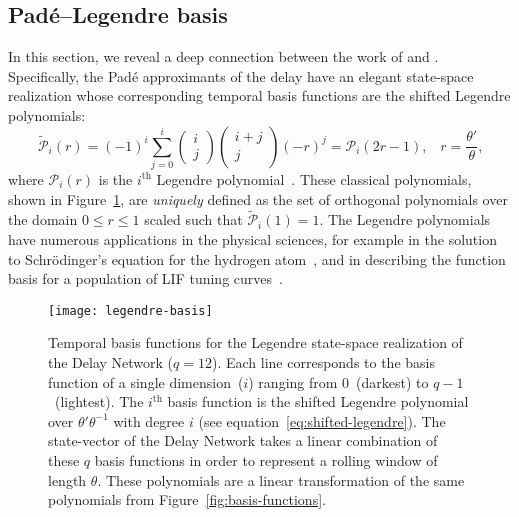 \subsection{Pad\'e--Legendre basis}
\label{sec:legendre-basis}

In this section, we reveal a deep connection between the work of \citet{legendre1782recherches} and \citet{Pade1892}.
Specifically, the Pad\'e approximants of the delay have an elegant state-space realization whose corresponding temporal basis functions are the shifted Legendre polynomials:
\begin{equation} \label{eq:shifted-legendre}
\tilde{\mathcal{P}}_i(r) = (-1)^i \sum_{j=0}^i \begin{pmatrix}i \\ j\end{pmatrix} \begin{pmatrix}i + j \\ j\end{pmatrix} \left( -r \right)^j = \mathcal{P}_i\left( 2 r - 1\right) \text{,} \quad r = \frac{\theta'}{\theta} \text{,}
\end{equation}
where $\mathcal{P}_i(r)$ is the $i^\text{th}$ Legendre polynomial~\citep{rodrigues1816attraction}.
These classical polynomials, shown in Figure~\ref{fig:legendre-basis}, are \emph{uniquely} defined as the set of orthogonal polynomials over the domain $0 \le r \le 1$ scaled such that $\tilde{\mathcal{P}}_i(1) = 1$.
The Legendre polynomials have numerous applications in the physical sciences, for example in the solution to Schr{\"o}dinger's equation for the hydrogen atom~\citep{hermann1988split}, and in describing the function basis for a population of LIF tuning curves~\citep[][p.~202]{eliasmith2003a}.

\begin{figure}
  \centering
  \texttt{[image: legendre-basis]}
  \caption[Legendre basis realization of the Delay Network.]{ \label{fig:legendre-basis}
    Temporal basis functions for the Legendre state-space realization of the Delay Network ($q = 12$).
    Each line corresponds to the basis function of a single dimension~($i$) ranging from $0$~(darkest) to $q - 1$~(lightest).
    The $i^\text{th}$ basis function is the shifted Legendre polynomial over $\theta' \theta^{-1}$ with degree $i$ (see equation~\ref{eq:shifted-legendre}).
    The state-vector of the Delay Network takes a linear combination of these $q$ basis functions in order to represent a rolling window of length $\theta$.
    These polynomials are a linear transformation of the same polynomials from Figure~\ref{fig:basis-functions}.
  }
\end{figure}

